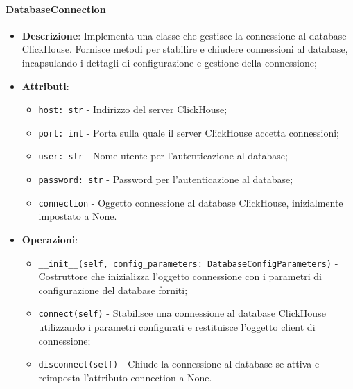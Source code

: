 \documentclass[10pt]{article}
\begin{document}
    \paragraph{DatabaseConnection}
    \begin{itemize} 
    \item \textbf{Descrizione}: Implementa una classe che gestisce la connessione al database ClickHouse. Fornisce metodi per stabilire e chiudere connessioni al database, incapsulando i dettagli di configurazione e gestione della connessione;
    \item \textbf{Attributi}:
    \begin{itemize}
        \item \texttt{host: str} - Indirizzo del server ClickHouse;
        \item \texttt{port: int} - Porta sulla quale il server ClickHouse accetta connessioni;
        \item \texttt{user: str} - Nome utente per l'autenticazione al database;
        \item \texttt{password: str} - Password per l'autenticazione al database;
        \item \texttt{connection} - Oggetto connessione al database ClickHouse, inizialmente impostato a None.
    \end{itemize}
    
    \item \textbf{Operazioni}:
    \begin{itemize}
        \item \texttt{\_\_init\_\_(self, config\_parameters: DatabaseConfigParameters)} - Costruttore che inizializza l'oggetto connessione con i parametri di configurazione del database forniti;
        
        \item \texttt{connect(self)} - Stabilisce una connessione al database ClickHouse utilizzando i parametri configurati e restituisce l'oggetto client di connessione;
        
        \item \texttt{disconnect(self)} - Chiude la connessione al database se attiva e reimposta l'attributo connection a None.
    \end{itemize}
    \end{itemize}
\end{document}
